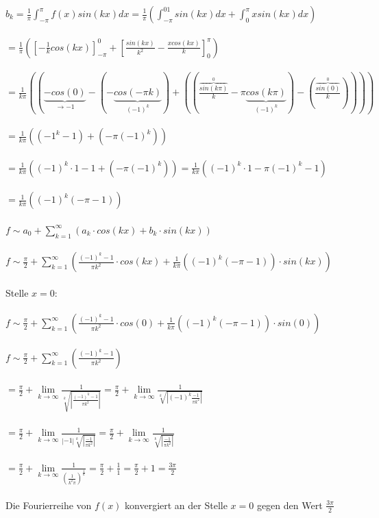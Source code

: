 \documentclass[12pt,a4paper]{article}
\begin{document}
$b_k=\frac{1}{\pi}\int_{-\pi}^\pi f(x)sin(kx)dx = \frac{1}{\pi}(\int_{-\pi}^01sin(kx)dx+\int_0^\pi xsin(kx)dx)$\\
\\
$=\frac{1}{\pi}(\left[-\frac{1}{k}cos(kx)\right]_{-\pi}^0+\left[\frac{sin(kx)}{k^2}-\frac{xcos(kx)}{k}\right]_0^\pi)$\\
\\
$=\frac{1}{k\pi}((\underbrace{-cos(0)}_{\rightarrow -1}-(-\underbrace{cos(-\pi k)}_{(-1)^k})+((\frac{\overbrace{sin(k\pi)}^{0}}{k}-\pi \underbrace{cos(k\pi)}_{(-1)^k})-(\frac{\overbrace{sin(0)}^{0}}{k}))))$\\
\\
$=\frac{1}{k\pi}((-1^k-1)+(-\pi (-1)^k))$\\
\\
$=\frac{1}{k\pi}((-1)^k\cdot 1-1+(-\pi (-1)^k)) = \frac{1}{k\pi}((-1)^k\cdot 1-\pi (-1)^k-1)$\\
\\
$=\frac{1}{k\pi}((-1)^k(-\pi-1))$\\
\\
$f\sim a_0+\sum_{k=1}^\infty(a_k\cdot cos(kx)+b_k\cdot sin(kx))$\\
\\
$f\sim \frac{\pi}{2}+\sum_{k=1}^\infty(\frac{(-1)^k-1}{\pi k^2}\cdot cos(kx)+\frac{1}{k\pi}((-1)^k(-\pi-1))\cdot sin(kx))$\\
\\
Stelle $x=0:$\\
\\
$f\sim \frac{\pi}{2}+\sum_{k=1}^\infty(\frac{(-1)^k-1}{\pi k^2}\cdot cos(0)+\frac{1}{k\pi}((-1)^k(-\pi-1))\cdot sin(0))$\\
\\
$f\sim \frac{\pi}{2}+\sum_{k=1}^\infty(\frac{(-1)^k-1}{\pi k^2})$\\
\\
$= \frac{\pi}{2}+\lim \limits_{k\rightarrow \infty}\frac{1}{\sqrt[k]{|\frac{(-1)^k-1}{\pi k^2}|}}= \frac{\pi}{2}+\lim \limits_{k\rightarrow \infty}\frac{1}{\sqrt[k]{|(-1)^k\frac{-1}{\pi k^2}|}}$\\
\\
$= \frac{\pi}{2}+\lim \limits_{k\rightarrow \infty}\frac{1}{|-1|\sqrt[k]{|\frac{-1}{\pi k^2}|}}= \frac{\pi}{2}+\lim \limits_{k\rightarrow \infty}\frac{1}{\sqrt[k]{|\frac{-1}{\pi k^2}|}}$\\
\\
$= \frac{\pi}{2}+\lim \limits_{k\rightarrow \infty}\frac{1}{(\frac{1}{k^2\pi})^{\frac{1}{k}}} = \frac{\pi}{2}+\frac{1}{1} = \frac{\pi}{2}+1=\frac{3\pi}{2}$\\
\\
Die Fourierreihe von $f(x)$ konvergiert an der Stelle $x=0$ gegen den Wert $\frac{3\pi}{2}$
\end{document}
